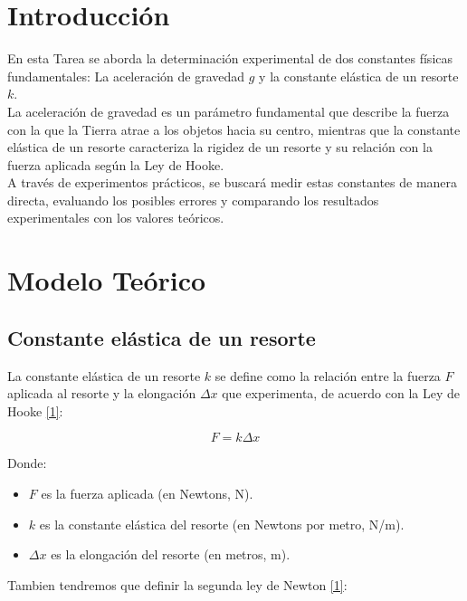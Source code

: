 \documentclass{article}
\begin{document}
\begin{multicols}{2}

\section{Introducción}

En esta Tarea se aborda la determinación experimental de
dos constantes físicas fundamentales: La aceleración de gravedad $g$
y la constante elástica de un resorte $k$.\\
La aceleración de gravedad es un parámetro fundamental que describe la
fuerza con la que la Tierra atrae a los objetos hacia su centro, mientras
que la constante elástica de un resorte caracteriza la rigidez de un resorte
y su relación  con la fuerza aplicada según la Ley de Hooke.\\
A través de experimentos prácticos, se buscará medir estas constantes de
manera directa, evaluando los posibles errores y comparando los resultados
experimentales con los valores teóricos.

\section{Modelo Teórico}

    \subsection{Constante elástica de un resorte}

        La constante elástica de un resorte $k$ se define como la relación entre la fuerza $F$ aplicada al
        resorte y la elongación $\Delta x$ que experimenta, de acuerdo con la Ley de Hooke \ref{1}:

            \begin{equation}
                F = k \Delta x
            \end{equation}

        Donde:
            \begin{itemize}
                \item $F$ es la fuerza aplicada (en Newtons, N).
                \item $k$ es la constante elástica del resorte (en Newtons por metro, N/m).
                \item $\Delta x$ es la elongación del resorte (en metros, m).
            \end{itemize}
        Tambien tendremos que definir la segunda ley de Newton \ref{1}:


\end{multicols}
\end{document}
